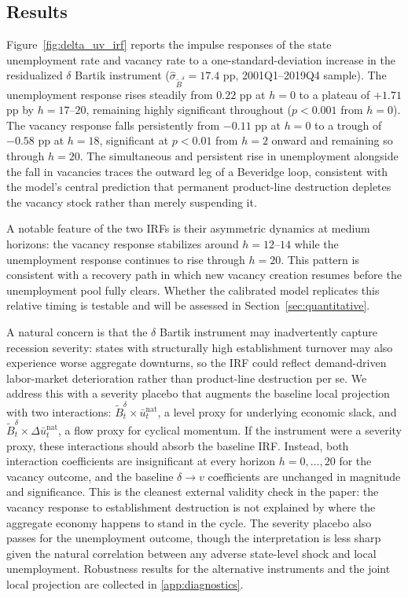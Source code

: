\documentclass[authoryear, review, 12pt]{elsarticle}
\begin{document}
	\subsection{Results}\label{sec:empirical_results}


	Figure~\ref{fig:delta_uv_irf} reports the impulse responses of the
	state unemployment rate and vacancy rate to a one-standard-deviation
	increase in the residualized $\delta$ Bartik instrument
	($\hat{\sigma}_{\tilde{B}^\delta} = 17.4$ pp, 2001Q1--2019Q4 sample).
	The unemployment response rises steadily from $0.22$ pp at $h=0$ to
	a plateau of $+1.71$ pp by $h=17$--$20$, remaining highly significant
	throughout ($p < 0.001$ from $h=0$).  The vacancy response falls
	persistently from $-0.11$ pp at $h=0$ to a trough of $-0.58$ pp at
	$h=18$, significant at $p < 0.01$ from $h=2$ onward and remaining so
	through $h=20$.  The simultaneous and persistent rise in unemployment
	alongside the fall in vacancies traces the outward leg of a Beveridge
	loop, consistent with the model's central prediction that permanent
	product-line destruction depletes the vacancy stock rather than merely
	suspending it.

	A notable feature of the two IRFs is their asymmetric dynamics at
	medium horizons: the vacancy response stabilizes around $h = 12$--$14$
	while the unemployment response continues to rise through $h = 20$.
	This pattern is consistent with a recovery path in which new vacancy
	creation resumes before the unemployment pool fully clears.  Whether the
	calibrated model replicates this relative timing is testable and will
	be assessed in Section~\ref{sec:quantitative}.


	A natural concern is that the $\delta$ Bartik instrument may inadvertently
	capture recession severity: states with structurally high establishment turnover
	may also experience worse aggregate downturns, so the IRF could reflect
	demand-driven labor-market deterioration rather than product-line destruction
	per se.  We address this with a severity placebo that augments the baseline
	local projection with two interactions: $\tilde{B}_t^\delta \times
	\bar{u}_t^{\text{nat}}$, a level proxy for underlying economic slack, and
	$\tilde{B}_t^\delta \times \Delta\bar{u}_t^{\text{nat}}$, a flow proxy for
	cyclical momentum.  If the instrument were a severity proxy, these interactions
	should absorb the baseline IRF.  Instead, both interaction coefficients are
	insignificant at every horizon $h = 0, \ldots, 20$ for the vacancy outcome, and
	the baseline $\delta \to v$ coefficients are unchanged in magnitude and
	significance.  This is the cleanest external validity check in the paper: the
	vacancy response to establishment destruction is not explained by where
	the aggregate economy happens to stand in the cycle.  The severity placebo
	also passes for the unemployment outcome, though the interpretation is less
	sharp given the natural correlation between any adverse state-level shock and
	local unemployment.  Robustness results for the alternative instruments and
	the joint local projection are collected in
\ref{app:diagnostics}.
\end{document}
